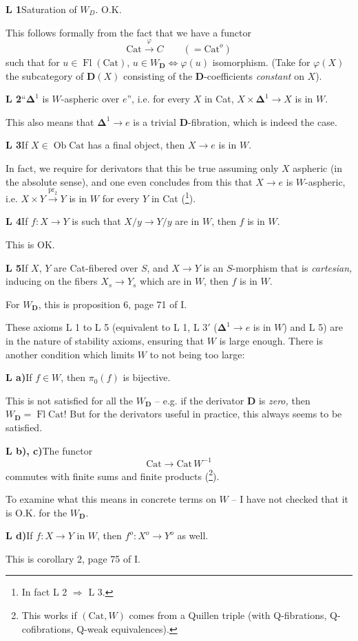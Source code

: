 \documentclass[11pt]{article}
\newcommand{\printedpage}[1]{\marginpar{\footnotesize p.~#1}}
\newcommand{\msp}[1]{\marginpar{\footnotesize [#1]}}
\newcommand{\D}{\mathbf{D}}
\newcommand{\Cat}{\mathrm{Cat}}
\newcommand{\Fl}{\operatorname{Fl}}
\newcommand{\Ob}{\operatorname{Ob}}
\newcommand{\bDelta}{\boldsymbol{\Delta}}
\begin{document}
\textbf{L 1}\enspace Saturation of $W_D$. O.K.

This follows formally from the fact that we have a functor
\[
\Cat \xrightarrow{\varphi} C \qquad (= \Cat^o)
\]
such that for $u \in \Fl(\Cat)$, $u \in W_{\D} \iff \varphi(u)$ isomorphism. (Take for $\varphi(X)$ the subcategory of $\D(X)$ consisting of the $\D$-coefficients \textit{constant} on $X$).

\textbf{L 2}\enspace ``$\bDelta^1$ is $W$-aspheric over $e$'', i.e. for every $X$ in Cat, $X \times \bDelta^1 \longrightarrow X$ is in $W$.

This also means that $\bDelta^1 \longrightarrow e$ is a trivial $\D$-fibration, which is indeed the case.

\clearpage

\printedpage{3}

\textbf{L 3}\enspace If $X \in \Ob\Cat$ has a final object, then $X \longrightarrow e$ is in $W$.

In fact, we require for derivators that this be true assuming only $X$ aspheric (in the absolute sense), and one even concludes from this that $X \longrightarrow e$ is $W$-aspheric, i.e. $X \times Y \xrightarrow{\mathrm{pr}_2} Y$ is in $W$ for every $Y$ in Cat (\footnote{In fact L 2 $\Longrightarrow$ L 3.}).

\textbf{L 4}\enspace If $f : X \longrightarrow Y$ is such that $X/y \longrightarrow Y/y$ are in $W$, then $f$ is in $W$.

This is OK.

\msp{page 5}
\textbf{L 5}\enspace If $X$, $Y$ are Cat-fibered over $S$, and $X \longrightarrow Y$ is an $S$-morphism that is \textit{cartesian,} inducing on the fibers $X_s \longrightarrow Y_s$ which are in $W$, then $f$ is in $W$.

For $W_{\D}$, this is proposition 6, page 71 of I.

These axioms L 1 to L 5 (equivalent to L 1, L 3$'$ ($\bDelta^1 \longrightarrow e$ is in $W$) and L 5) are in the nature of stability axioms, ensuring that $W$ is large enough. There is another condition which limits $W$ to not being too large:

\textbf{L a)}\enspace If $f \in W$, then $\pi_0(f)$ is bijective.

This is not satisfied for all the $W_{\D}$ – e.g. if the derivator $\D$ is \textit{zero,} then $W_{\D} = \Fl\Cat$! But for the derivators useful in practice, this always seems to be satisfied.

\textbf{L b), c)}\enspace The functor
\[
\Cat \longrightarrow \Cat\, W^{-1}
\]
commutes with finite sums and finite products (\footnote{This works if $(\Cat, W)$ comes from a Quillen triple (with Q-fibrations, Q-cofibrations, Q-weak equivalences).}).

To examine what this means in concrete terms on $W$ – I have not checked that it is O.K. for the $W_{\D}$.

\textbf{L d)}\enspace If $f : X \longrightarrow Y$ in $W$, then $f^o : X^o \longrightarrow Y^o$ as well.

This is corollary 2, page 75 of I.
\end{document}
